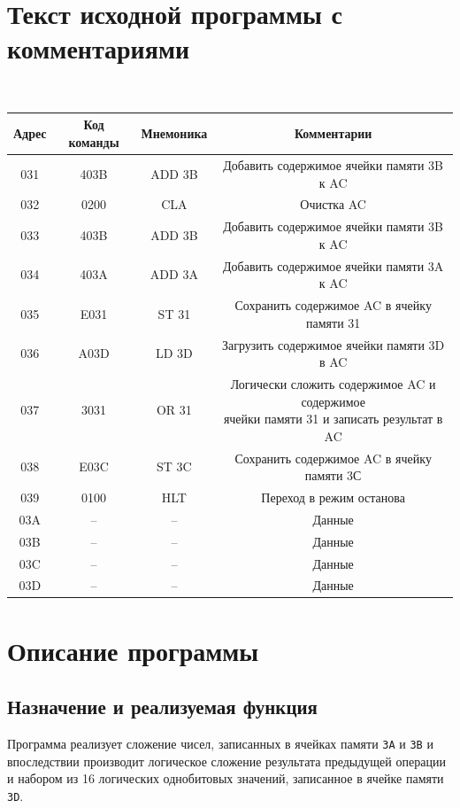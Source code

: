 \documentclass[11pt,a4paper]{article}
\begin{document}
	\section{Текст исходной программы с комментариями}
	\begin{table}[H]
		{\tt
	  \begin{tabular}{|c|c|c|c|}
	  	\hline
	  	\textbf{Адрес} & \textbf{Код команды} & \textbf{Мнемоника} &           \textbf{Комментарии}            \\ \hline
	  	     031       &         403B         &       ADD 3B       & Добавить содержимое ячейки памяти 3B к AC \\ \hline
	  	     032       &         0200         &        CLA         &                Очистка AC                 \\ \hline
	  	     033       &         403B         &       ADD 3B       & Добавить содержимое ячейки памяти 3B к AC \\ \hline
	  	     034       &         403A         &       ADD 3A       & Добавить содержимое ячейки памяти 3A к AC \\ \hline
	  	     035 & E031 & ST 31 & Сохранить содержимое AC в ячейку памяти 31\\ \hline
	  	     036 & A03D & LD 3D & Загрузить содержимое ячейки памяти 3D в AC\\ \hline
	  	     037 & 3031 & OR 31 & \makecell{Логически сложить содержимое AC и содержимое\\ ячейки памяти 31 и записать результат в AC}\\ \hline
	  	     038 & E03C & ST 3C & Сохранить содержимое AC в ячейку памяти 3С\\ \hline
	  	     039 & 0100 & HLT & Переход в режим останова\\ \hline
	  	     03A & -- & -- & Данные\\ \hline
	  	     03B & -- & -- & Данные\\ \hline
	  	     03C & -- & -- & Данные\\ \hline
	  	     03D & -- & -- & Данные\\ \hline
	  \end{tabular}
       }
    \end{table}
\section{Описание программы}
\subsection{Назначение и реализуемая функция}
Программа реализует сложение чисел, записанных в ячейках памяти \texttt{3A} и \texttt{3B} и впоследствии производит логическое сложение результата предыдущей операции и набором из 16 логических однобитовых значений, записанное в ячейке памяти \texttt{3D}.
\end{document}
